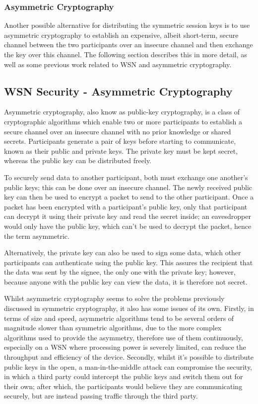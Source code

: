 \documentclass{mprop}
\begin{document}
\subsubsection{Asymmetric Cryptography} %
\label{ssub:asymmetric_cryptography}
Another possible alternative for distributing the symmetric session keys is to use asymmetric cryptography to establish an expensive, albeit short-term, secure channel between the two participants over an insecure channel and then exchange the key over this channel. The following section describes this in more detail, as well as some previous work related to WSN and asymmetric cryptography.

\subsection{WSN Security - Asymmetric Cryptography} %
\label{sub:asymmetric_security}
Asymmetric cryptography, also know as public-key cryptography, is a class of cryptographic algorithms which enable two or more participants to establish a secure channel over an insecure channel with no prior knowledge or shared secrets. Participants generate a pair of keys before starting to communicate, known as their public and private keys. The private key must be kept secret, whereas the public key can be distributed freely. 

To securely send data to another participant, both must exchange one another's public keys; this can be done over an insecure channel. The newly received public key can then be used to encrypt a packet to send to the other participant. Once a packet has been encrypted with a participant's public key, only that participant can decrypt it using their private key and read the secret inside; an eavesdropper would only have the public key, which can't be used to decrypt the packet, hence the term asymmetric. 

Alternatively, the private key can also be used to sign some data, which other participants can authenticate using the public key. This assures the recipient that the data was sent by the signee, the only one with the private key; however, because anyone with the public key can view the data, it is therefore not secret.

Whilst asymmetric cryptography seems to solve the problems previously discussed in symmetric cryptography, it also has some issues of its own. Firstly, in terms of size and speed, asymmetric algorithms tend to be several orders of magnitude slower than symmetric algorithms, due to the more complex algorithms used to provide the asymmetry, therefore use of them continuously, especially on a WSN where processing power is severely limited, can reduce the throughput and efficiency of the device.
Secondly, whilst it's possible to distribute public keys in the open, a man-in-the-middle attack can compromise the security, in which a third party could intercept the public keys and switch them out for their own; after which, the participants would believe they are communicating securely, but are instead passing traffic through the third party.
\end{document}
